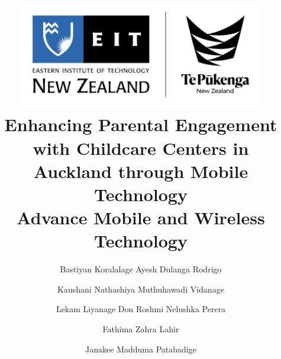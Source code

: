 \begin{titlepage}
\centering
\title{%
\includegraphics [width=0.5\columnwidth,keepaspectratio]{Figures/eit-logo.png}\\
  Enhancing Parental Engagement with Childcare Centers in Auckland through Mobile Technology \\
  \large Advance Mobile and Wireless Technology}


\author{{Bastiyan Koralalage Ayesh Dulanga Rodrigo}
{}}
 
\author{Kaushani Nathashiya Muthuhawadi Vidanage}
\author{Lekam Liyanage Don Roshmi Nelushka Perera}
\author{Fathima Zahra Lahir}
\author{Janakee Madduma Patabadige}


\address{Faculty of Information Technology, Eastern Institute of Technology, Auckland 2024, New Zealand}

\end{titlepage}

